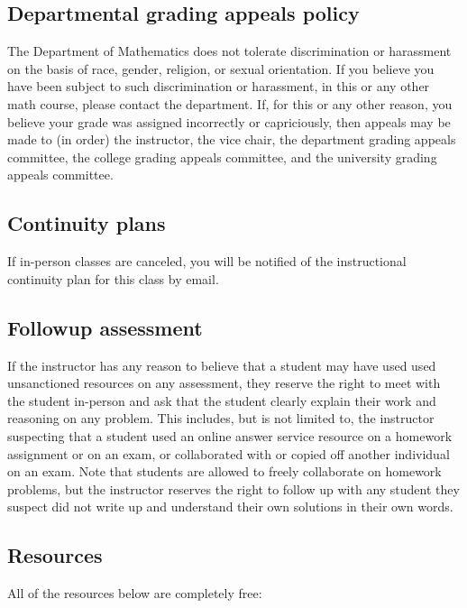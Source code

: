 \documentclass[12pt]{amsart}
\begin{document}
\subsection*{Departmental grading appeals policy} 
The Department of Mathematics does not tolerate discrimination or harassment on the basis of race, gender, religion, or sexual orientation. If you believe you have been subject to such discrimination or harassment, in this or any other math course, please contact the department. If, for this or any other reason, you believe your grade was assigned incorrectly or capriciously, then appeals may be made to (in order) the instructor, the vice chair, the department grading appeals committee, the college grading appeals committee, and the university grading appeals committee.


\subsection*{Continuity plans} 
If in-person classes are canceled, you will be notified of the instructional continuity plan for this class by email.

\subsection*{Followup assessment} If the instructor has any reason to believe that a student may have used used unsanctioned resources on any assessment, they reserve the right to meet with the student in-person and ask that the student clearly explain their work and reasoning on any problem. This includes, but is not limited to, the instructor suspecting that a student used an online answer service resource on a homework assignment or on an exam, or collaborated with or copied off another individual on an exam. Note that students are allowed to freely collaborate on homework problems, but the instructor reserves the right to follow up with any student they suspect did not write up and {understand} their own solutions in their own words.

\subsection*{Resources}All of the resources below are completely {free}:
\medskip
\end{document}
